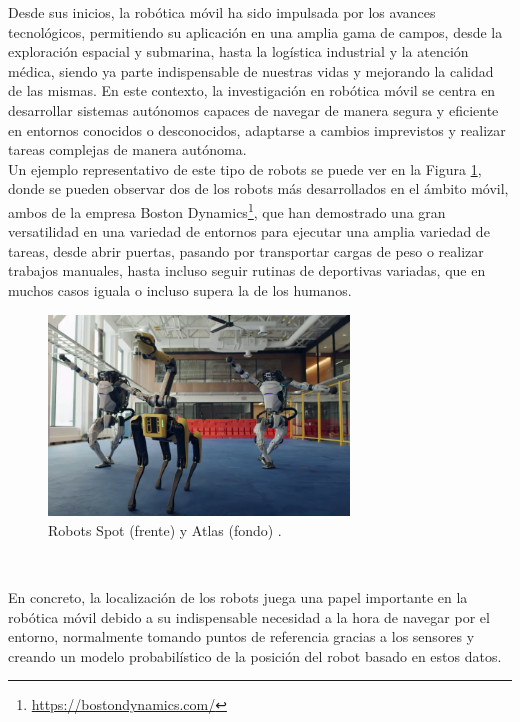 Desde sus inicios, la robótica móvil ha sido impulsada por los avances
tecnológicos, permitiendo su aplicación en una amplia gama de campos, desde la
exploración espacial y submarina, hasta la logística industrial y la atención
médica, siendo ya parte indispensable de nuestras vidas y mejorando la calidad
de las mismas.
En este contexto, la investigación en robótica móvil se centra en desarrollar
sistemas autónomos capaces de navegar de manera segura y eficiente en entornos
conocidos o desconocidos, adaptarse a cambios imprevistos y realizar tareas
complejas de manera autónoma.
\\

Un ejemplo representativo de este tipo de robots se puede ver en la Figura
\ref{fig:boston_dynamics}, donde se pueden observar dos de los robots más
desarrollados en el ámbito móvil, ambos de la empresa Boston
Dynamics\footnote{\url{https://bostondynamics.com/}}, que han demostrado una
gran versatilidad en una variedad de entornos para ejecutar una amplia variedad
de tareas, desde abrir puertas, pasando por transportar cargas de peso o
realizar trabajos manuales, hasta incluso seguir rutinas de deportivas variadas,
que en muchos casos iguala o incluso supera la de los humanos.

\begin{figure} [h!]
  \begin{center}
    \includegraphics[width=8cm]{figs/atlas_spot_robots}
  \end{center}
  \caption{Robots Spot (frente) y Atlas (fondo) \cite{atlas_spot}.}
  \label{fig:boston_dynamics}
\end{figure}\

En concreto, la localización de los robots juega una papel importante en la
robótica móvil debido a su indispensable necesidad a la hora de navegar por el
entorno, normalmente tomando puntos de referencia gracias a los sensores y
creando un modelo probabilístico de la posición del robot basado en estos datos.
\\

